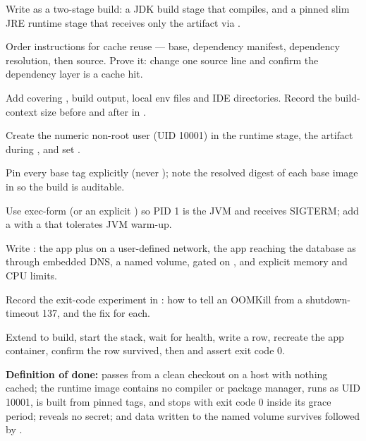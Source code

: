 \begin{buildalong}
\begin{wbitem}
  \item Write  as a two-stage build: a JDK build stage that compiles, and a pinned slim JRE runtime stage that receives only the artifact via .
  \item Order instructions for cache reuse --- base, dependency manifest, dependency resolution, then source. Prove it: change one source line and confirm the dependency layer is a cache hit.
  \item Add  covering , build output, local env files and IDE directories. Record the build-context size before and after in .
  \item Create the numeric non-root user (UID 10001) in the runtime stage,  the artifact during , and set .
  \item Pin every base tag explicitly (never ); note the resolved digest of each base image in  so the build is auditable.
  \item Use exec-form  (or an explicit ) so PID 1 is the JVM and receives SIGTERM; add a  with a  that tolerates JVM warm-up.
  \item Write : the app plus  on a user-defined network, the app reaching the database as  through embedded DNS, a  named volume,  gated on , and explicit memory and CPU limits.
  \item Record the exit-code experiment in : how to tell an OOMKill from a shutdown-timeout 137, and the fix for each.
  \item Extend  to build, start the stack, wait for health, write a row, recreate the app container, confirm the row survived, then  and assert exit code 0.
\end{wbitem}
\smallskip\textbf{Definition of done:}  passes from a clean checkout on a host with nothing cached; the runtime image contains no compiler or package manager, runs as UID 10001, is built from pinned tags, and stops with exit code 0 inside its grace period;  reveals no secret; and data written to the named volume survives  followed by .
\end{buildalong}

